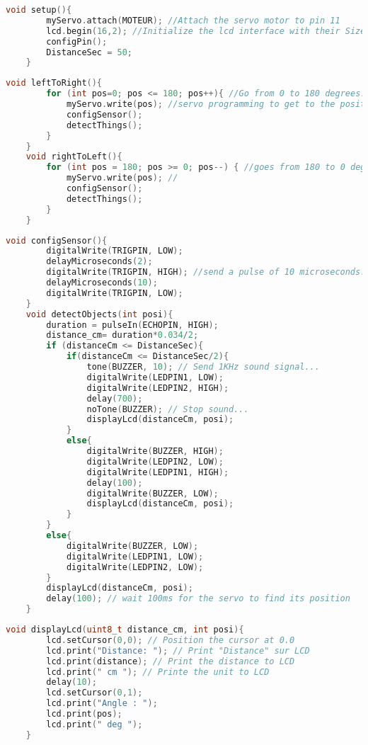 \begin{lstlisting}[language=cpp,caption={Setup Funtion}]
    void setup(){
        myServo.attach(MOTEUR); //Attach the servo motor to pin 11
        lcd.begin(16,2); //Initialize the lcd interface with their Size
        configPin();
        DistanceSec = 50;
    }
\end{lstlisting}

\begin{lstlisting}[language=cpp,caption={Define leftToRight and rightToLeft Function}]
    void leftToRight(){
        for (int pos=0; pos <= 180; pos++){ //Go from 0 to 180 degrees.
            myServo.write(pos); //servo programming to get to the position(pos).
            configSensor();
            detectThings();
        }
    }
    void rightToLeft(){
        for (int pos = 180; pos >= 0; pos--) { //goes from 180 to 0 degree
            myServo.write(pos); //
            configSensor();
            detectThings();
        }
    }
\end{lstlisting}

\begin{lstlisting}[language=cpp,caption={Define detectThings and configSensor Function}]
    void configSensor(){
        digitalWrite(TRIGPIN, LOW);
        delayMicroseconds(2);
        digitalWrite(TRIGPIN, HIGH); //send a pulse of 10 microseconds.
        delayMicroseconds(10);
        digitalWrite(TRIGPIN, LOW);
    }
    void detectObjects(int posi){
        duration = pulseIn(ECHOPIN, HIGH);
        distance_cm= duration*0.034/2;
        if (distanceCm <= DistanceSec){
            if(distanceCm <= DistanceSec/2){
                tone(BUZZER, 10); // Send 1KHz sound signal...
                digitalWrite(LEDPIN1, LOW);
                digitalWrite(LEDPIN2, HIGH);
                delay(700);
                noTone(BUZZER); // Stop sound...
                displayLcd(distanceCm, posi);
            }
            else{
                digitalWrite(BUZZER, HIGH);
                digitalWrite(LEDPIN2, LOW);
                digitalWrite(LEDPIN1, HIGH);
                delay(100);
                digitalWrite(BUZZER, LOW);
                displayLcd(distanceCm, posi);
            }
        }
        else{
            digitalWrite(BUZZER, LOW);
            digitalWrite(LEDPIN1, LOW);
            digitalWrite(LEDPIN2, LOW);
        }
        displayLcd(distanceCm, posi);
        delay(100); // wait 100ms for the servo to find its position
    }
\end{lstlisting}

\begin{lstlisting}[language=cpp,caption={Define displayLCD Funtion}]
    void displayLcd(uint8_t distance_cm, int posi){
        lcd.setCursor(0,0); // Position the cursor at 0.0
        lcd.print("Distance: "); // Print "Distance" sur LCD
        lcd.print(distance); // Print the distance to LCD
        lcd.print(" cm "); // Printe the unit to LCD
        delay(10);
        lcd.setCursor(0,1);
        lcd.print("Angle : ");
        lcd.print(pos);
        lcd.print(" deg ");
    }
\end{lstlisting}